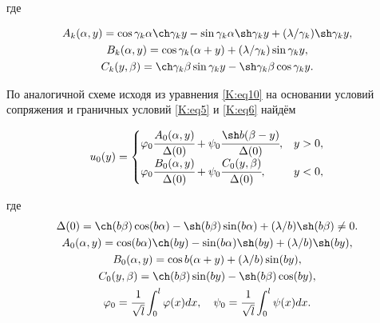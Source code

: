где

\begin{gather}

\label{K:eq24}

A_k(\alpha,y)=\cos \gamma_k \alpha \ch \gamma_k y - \sin \gamma_k \alpha \sh \gamma_k y +({\lambda}/{\gamma_k}) \sh \gamma_k y,\\

\label{K:eq24}

B_k(\alpha,y)=\cos \gamma_k (\alpha + y) +({\lambda}/{\gamma_k}) \sin \gamma_k y,\\

\label{K:eq24}

C_k(y,\beta)=\ch \gamma_k \beta \sin \gamma_k y - \sh \gamma_k \beta \cos \gamma_k y.

\end{gather}

По аналогичной схеме исходя из уравнения \eqref{K:eq10} на основании условий сопряжения и граничных условий \eqref{K:eq5} и \eqref{K:eq6} найдём

\begin{equation}

\label{K:eq25}

u_{0}(y)=\begin{cases}

\varphi_0\cfrac{A_{0}(\alpha, y)}{\Delta (0)}+\psi_0\cfrac{\sh b(\beta-y)}{\Delta(0)},& y>0,\\

\varphi_0\cfrac{B_{0}(\alpha, y)}{\Delta (0)}+\psi_0\cfrac{C_{0}(y,\beta)}{\Delta(0)},& y<0,

\end{cases}

\end{equation}

где \\

\begin{gather}

\label{K:eq26}

\Delta(0)=\ch (b\beta)\cos (b\alpha)-\sh(b\beta)\sin (b\alpha)+({\lambda}/{b})\sh(b\beta)\neq0.

\\

A_{0}(\alpha,y)=\cos (b\alpha) \ch (by)-\sin (b\alpha)\sh(by)+({\lambda}/{b})\sh(by),

\\

B_{0}(\alpha,y)=\cos b(\alpha+y)+({\lambda}/{b})\sin(by),

\\

C_{0}(y,\beta)=\ch(b\beta)\sin (by)-\sh(b\beta)\cos (by),

\\

\varphi_{0} =\cfrac{1}{\sqrt{l}} \int _0^l \varphi(x) dx, \quad \psi_{0}=\cfrac{1}{\sqrt{l}} \int _0^l \psi(x) dx.

\end{gather}

